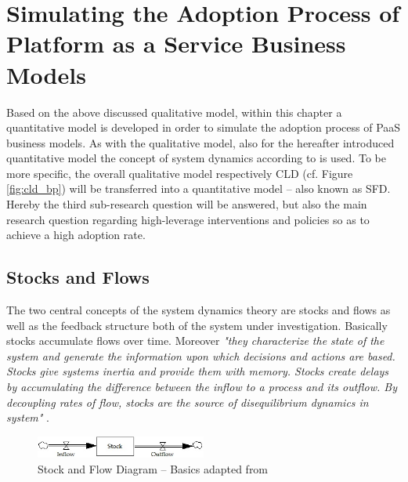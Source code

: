 \chapter{Simulating the Adoption Process of Platform as a Service Business Models}\label{ch:sfd}

Based on the above discussed qualitative model, within this chapter a quantitative model is developed in order to simulate the adoption process of \ac{PaaS} business models. As with the qualitative model, also for the hereafter introduced quantitative model the concept of system dynamics according to \citet{Sterman2000,Sterman2001} is used. To be more specific, the overall qualitative model respectively \ac{CLD} (cf. Figure \ref{fig:cld_bp}) will be transferred into a quantitative model -- also known as \acf{SFD}. Hereby the third sub-research question will be answered, but also the main research question regarding high-leverage interventions and policies so as to achieve a high adoption rate.

\section{Stocks and Flows}\label{ch:sfd:sf}

The two central concepts of the system dynamics theory are stocks and flows as well as the feedback structure both of the system under investigation. Basically stocks accumulate flows over time. Moreover \textit{"they characterize the state of the system and generate the information upon which decisions and actions are based. Stocks give systems inertia and provide them with memory. Stocks create delays by accumulating the difference between the inflow to a process and its outflow. By decoupling rates of flow, stocks are the source of disequilibrium dynamics in system"} \citep[p. 192]{Sterman2000}.

\begin{figure}[tb]
	\centering
	\includegraphics[width=0.5\textwidth]{gfx/sfd_basic}
	\caption[Stock and Flow Diagram -- Basics]{Stock and Flow Diagram -- Basics adapted from \citet[p. 194]{Sterman2000}}
	\label{fig:sfd_b}
\end{figure}

